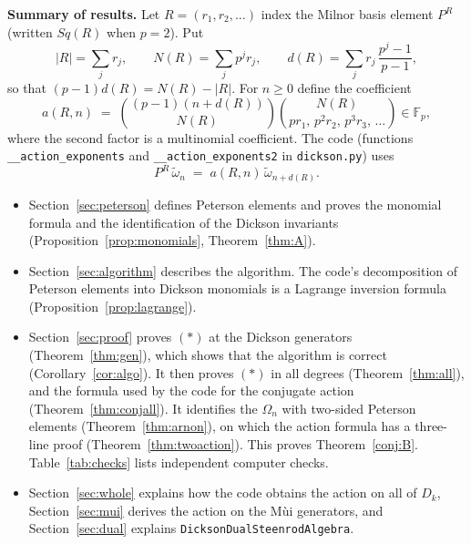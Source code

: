 \documentclass[11pt]{amsart}
\theoremstyle{definition}
\theoremstyle{remark}
\newcommand{\F}{\mathbb{F}_p}
\newcommand{\Dk}{D_k}
\newcommand{\wt}{\widetilde{\omega}}
\newcommand{\code}[1]{\texttt{#1}}
\begin{document}
\medskip\noindent\textbf{Summary of results.}  Let $R=(r_1,r_2,\dots)$ index the
Milnor basis element $P^R$ (written $Sq(R)$ when $p=2$).  Put
\[
  |R|=\sum_j r_j,\qquad N(R)=\sum_j p^j r_j,\qquad
  d(R)=\sum_j r_j\,\frac{p^j-1}{p-1},
\]
so that $(p-1)d(R)=N(R)-|R|$.  For $n\ge 0$ define the coefficient
\begin{equation}\label{eq:aRn}
  a(R,n)\;=\;\binom{(p-1)(n+d(R))}{N(R)}\binom{N(R)}{pr_1,\,p^2r_2,\,p^3r_3,\,\dots}\in\F ,
\end{equation}
where the second factor is a multinomial coefficient.  The code (functions
\code{\_\_action\_exponents} and \code{\_\_action\_exponents2} in
\code{dickson.py}) uses
\[
   P^R\,\wt_n \;=\; a(R,n)\,\wt_{n+d(R)} .\tag{$\ast$}
\]
\begin{itemize}
\item Section~\ref{sec:peterson} defines Peterson elements and proves the
  monomial formula and the identification of the Dickson invariants
  (Proposition~\ref{prop:monomials}, Theorem~\ref{thm:A}).
\item Section~\ref{sec:algorithm} describes the algorithm.  The code's
  decomposition of Peterson elements into Dickson monomials is a Lagrange
  inversion formula (Proposition~\ref{prop:lagrange}).
\item Section~\ref{sec:proof} proves $(\ast)$ at the Dickson generators
  (Theorem~\ref{thm:gen}), which shows that the algorithm is correct
  (Corollary~\ref{cor:algo}).  It then proves $(\ast)$ in all degrees
  (Theorem~\ref{thm:all}), and the formula used by the code for the
  conjugate action (Theorem~\ref{thm:conjall}).  It identifies the
  $\Omega_n$ with two-sided Peterson elements (Theorem~\ref{thm:arnon}), on
  which the action formula has a three-line proof
  (Theorem~\ref{thm:twoaction}).  This proves Theorem~\ref{conj:B}.  Table~\ref{tab:checks} lists
  independent computer checks.
\item Section~\ref{sec:whole} explains how the code obtains the action on all
  of $\Dk$, Section~\ref{sec:mui} derives the action on the M\`ui generators,
  and Section~\ref{sec:dual} explains
  \code{DicksonDualSteenrodAlgebra}.
\end{itemize}
\end{document}
